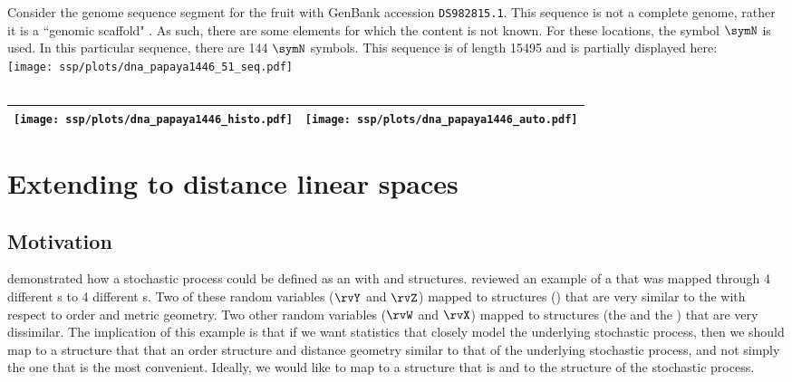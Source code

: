 \begin{example}
\label{ex:dna_papaya}
Consider the genome sequence segment for the fruit
 with GenBank accession \lstinline{DS982815.1}.
This sequence is not a complete genome, rather it is a ``genomic scaffold" . 
As such, there are some elements for which the content is not known.
For these locations, the symbol $\symN$ is used.
In this particular sequence, there are 144 $\symN$ symbols.
This sequence is of length 15495 and is partially displayed here:
  \\\texttt{[image: ssp/plots/dna\_papaya1446\_51\_seq.pdf]}\\
     \\\begin{tabular}{|>{\scs}c|>{\scs}c|}
          \hline
          \texttt{[image: ssp/plots/dna\_papaya1446\_histo.pdf]}%
         &\texttt{[image: ssp/plots/dna\_papaya1446\_auto.pdf]}
        \\\hline
     \end{tabular}
\end{example}

\section{Extending to distance linear spaces}
\subsection{Motivation}
 demonstrated how a stochastic process could be defined as an 
with  and  structures.
 reviewed an example of a  
that was mapped through 4 different s to 4 different s.
Two of these random variables ($\rvY$ and $\rvZ$) mapped to structures () that are very similar 
to the  with respect to order and metric geometry.
Two other random variables ($\rvW$ and $\rvX$) mapped to structures 
(the  and the ) that are very dissimilar.
The implication of this example is that if we want statistics that closely model the underlying stochastic process,
then we should map to a structure that that an order structure and distance geometry similar to 
that of the underlying stochastic process, and not simply the one that is the most convenient.
Ideally, we would like to map to a structure that is  
and   to the structure of the stochastic process.

